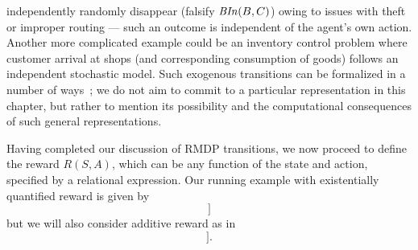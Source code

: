 \begin{itemize}
  independently randomly disappear (falsify $\mathit{BIn}(B,C)$) owing to
  issues with theft or improper routing --- such an outcome is
  independent of the agent's own action.  
  Another more complicated example could be an
  inventory control problem where customer arrival at shops (and
  corresponding consumption of goods) follows an independent
  stochastic model.  Such exogenous transitions can be formalized
  in a number of ways~\cite{Sanner08,sanner:icaps07,JoshiKhRaTaFe13};
  we do not aim to commit to a particular representation in this chapter,
  but rather to mention its possibility and the computational
  consequences of such general representations.
\end{itemize}

%
%
%
%

Having completed our discussion of RMDP transitions, we now proceed to
define the reward $R(S,A)$, which can be any function of the state and
action, specified by a relational expression. 
Our running example with existentially quantified reward is given by
\begin{equation}
[\max_B [\BIn(B,\paris): 10; \neg  \BIn(B,\paris): 0]]
\label{eq:reward}
\end{equation}
but we will also consider additive reward as in 
\begin{equation}
[\sum_B [\BIn(B,\paris): 10; \neg  \BIn(B,\paris): 0]].
\label{eq:reward-additive}
\end{equation}


%
%
%

%
%
%
%
%
%
%
%









